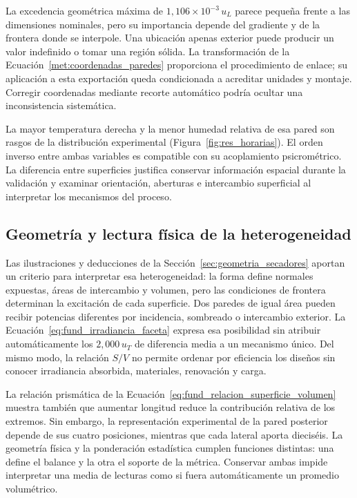 La excedencia geométrica máxima de $1{,}106\times10^{-3}\,u_L$ parece pequeña frente a las dimensiones nominales, pero su importancia depende del gradiente y de la frontera donde se interpole. Una ubicación apenas exterior puede producir un valor indefinido o tomar una región sólida. La transformación de la Ecuación~\eqref{met:coordenadas_paredes} proporciona el procedimiento de enlace; su aplicación a esta exportación queda condicionada a acreditar unidades y montaje. Corregir coordenadas mediante recorte automático podría ocultar una inconsistencia sistemática.

La mayor temperatura derecha y la menor humedad relativa de esa pared son rasgos de la distribución experimental (Figura~\ref{fig:res_horarias}). El orden inverso entre ambas variables es compatible con su acoplamiento psicrométrico. La diferencia entre superficies justifica conservar información espacial durante la validación y examinar orientación, aberturas e intercambio superficial al interpretar los mecanismos del proceso.

\subsection{Geometría y lectura física de la heterogeneidad}

Las ilustraciones y deducciones de la Sección~\ref{sec:geometria_secadores} aportan un criterio para interpretar esa heterogeneidad: la forma define normales expuestas, áreas de intercambio y volumen, pero las condiciones de frontera determinan la excitación de cada superficie. Dos paredes de igual área pueden recibir potencias diferentes por incidencia, sombreado o intercambio exterior. La Ecuación~\eqref{eq:fund_irradiancia_faceta} expresa esa posibilidad sin atribuir automáticamente los $2{,}000\,u_T$ de diferencia media a un mecanismo único. Del mismo modo, la relación $S/V$ no permite ordenar por eficiencia los diseños sin conocer irradiancia absorbida, materiales, renovación y carga.

La relación prismática de la Ecuación~\eqref{eq:fund_relacion_superficie_volumen} muestra también que aumentar longitud reduce la contribución relativa de los extremos. Sin embargo, la representación experimental de la pared posterior depende de sus cuatro posiciones, mientras que cada lateral aporta dieciséis. La geometría física y la ponderación estadística cumplen funciones distintas: una define el balance y la otra el soporte de la métrica. Conservar ambas impide interpretar una media de lecturas como si fuera automáticamente un promedio volumétrico.

